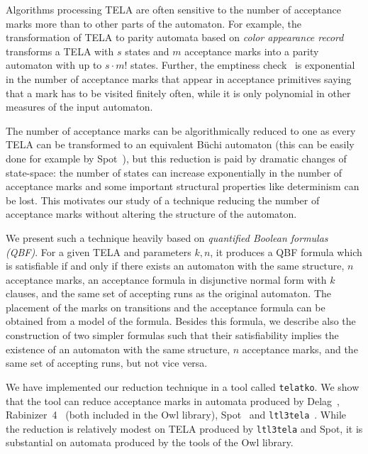 \documentclass[a4paper,UKenglish,cleveref,autoref,thm-restate]{lipics-v2021}
\newcommand{\telatko}{\texttt{telatko}\xspace}
\begin{document}
Algorithms processing TELA are often sensitive to the number of
acceptance marks more than to other parts of the automaton. For
example, the transformation of TELA to parity automata based on
\emph{color appearance record}~\cite{renkin.20.atva} transforms a TELA
with $s$ states and $m$ acceptance marks into a parity automaton with
up to $s\cdot m!$ states. Further, the emptiness
check~\cite{baier.19.atva} is exponential in the number of acceptance
marks that appear in acceptance primitives saying that a mark has to
be visited finitely often, while it is only polynomial in other
measures of the input automaton.

The number of acceptance marks can be algorithmically reduced to one
as every TELA can be transformed to an equivalent Büchi automaton
(this can be easily done for example by Spot~\cite{duret.16.atva2}),
but this reduction is paid by dramatic changes of state-space: the
number of states can increase exponentially in the number of
acceptance marks and some important structural properties like
determinism can be lost. This motivates our study of a technique
reducing the number of acceptance marks without altering the structure
of the automaton.

We present such a technique heavily based on \emph{quantified Boolean
  formulas (QBF)}. For a given TELA and parameters $k,n$, it produces
a QBF formula which is satisfiable if and only if there exists an
automaton with the same structure, $n$ acceptance marks, an acceptance
formula in disjunctive normal form with $k$ clauses, and the same set
of accepting runs as the original automaton. The placement of the
marks on transitions and the acceptance formula can be obtained from a
model of the formula. Besides this formula, we describe also the
construction of two simpler formulas such that their satisfiability
implies the existence of an automaton with the same structure, $n$
acceptance marks, and the same set of accepting runs, but not vice
versa.

We have implemented our reduction technique in a tool called
\telatko. We show that the tool can reduce acceptance marks in
automata produced by Delag~\cite{muller.17.gandalf},
Rabinizer~4~\cite{kretinsky.18.cav} (both included in the Owl library),
Spot~\cite{duret.16.atva2}
and \texttt{ltl3tela}~\cite{major.19.atva}.  While the reduction is relatively
modest on TELA produced by \texttt{ltl3tela} and Spot,
it is substantial on automata produced by the tools of the Owl library.
\end{document}
